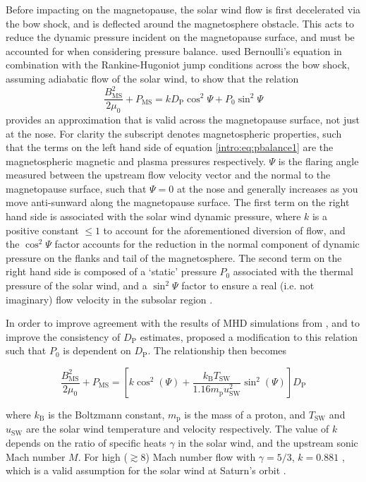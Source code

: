 Before impacting on the magnetopause, the solar wind flow is first decelerated via the bow shock, and is deflected around the magnetosphere obstacle. This acts to reduce the dynamic pressure incident on the magnetopause surface, and must be accounted for when considering pressure balance. \citet{petrinec1997} used Bernoulli's equation in combination with the Rankine-Hugoniot jump conditions across the bow shock, assuming adiabatic flow of the solar wind, to show that the relation
\begin{equation}\label{intro:eq:pbalance1}
\frac{B_{\mathrm{MS}}^2}{2\mu_0} + P_{\mathrm{MS}} = kD_\mathrm{P}\cos^2\Psi + P_0\sin^2\Psi
\end{equation}
provides an approximation that is valid across the magnetopause surface, not just at the nose. For clarity the subscript {} denotes magnetospheric properties, such that the terms on the left hand side of equation \ref{intro:eq:pbalance1} are the magnetospheric magnetic and plasma pressures respectively. $\Psi$ is the flaring angle measured between the upstream flow velocity vector and the normal to the magnetopause surface, such that $\Psi=0$ at the nose and generally increases as you move anti-sunward along the magnetopause surface. The first term on the right hand side is associated with the solar wind dynamic pressure, where $k$ is a positive constant $\leq1$ to account for the aforementioned diversion of flow, and the $\cos^2\Psi$ factor accounts for the reduction in the normal component of dynamic pressure on the flanks and tail of the magnetosphere. The second term on the right hand side is composed of a `static' pressure $P_0$ associated with the thermal pressure of the solar wind, and a $\sin^2\Psi$ factor to ensure a real (i.e. not imaginary) flow velocity in the subsolar region \citep[see][]{petrinec1997}.

In order to improve agreement with the results of MHD simulations from \citet{hansen2005}, and to improve the consistency of $D_\mathrm{P}$ estimates, \citet{kanani2010} proposed a modification to this relation such that $P_0$ is dependent on $D_\mathrm{P}$. The relationship then becomes

\begin{equation}\label{intro:eq:pbalance2}
\frac{B_\mathrm{MS}^2}{2\mu_0} + P_\mathrm{MS} = [k\cos^2(\Psi) + \frac{k_\mathrm{B}T_\mathrm{SW}}{1.16m_\mathrm{p}u_\mathrm{SW}^2}\sin^2(\Psi)] D_\mathrm{P}
\end{equation}

where $k_\mathrm{B}$ is the Boltzmann constant, $m_\mathrm{p}$ is the mass of a proton, and $T_\mathrm{SW}$ and $u_\mathrm{SW}$ are the solar wind temperature and velocity respectively. The value of $k$ depends on the ratio of specific heats $\gamma$ in the solar wind, and the upstream sonic Mach number $M$. For high (${\gtrsim}8$) Mach number flow with $\gamma = 5/3$, $k = 0.881$ \citep{spreiter1966}, which is a valid assumption for the solar wind at Saturn's orbit \cite[e.g.][]{slavin1985,achilleos2006}.

